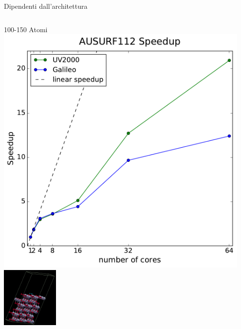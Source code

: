 \documentclass[8pt]{beamer}
\begin{document}
\begin{frame}{Dipendenti dall'architettura}
\begin{columns}
	
	\begin{center}	
		100-150 Atomi\\
		\includegraphics[width=0.95\textwidth]{concl_ausurf.pdf}\\		
		\includegraphics[height=3cm]{titania_crystal.png}
	\end{center}	
			


\end{columns}
\end{frame}
\end{document}
